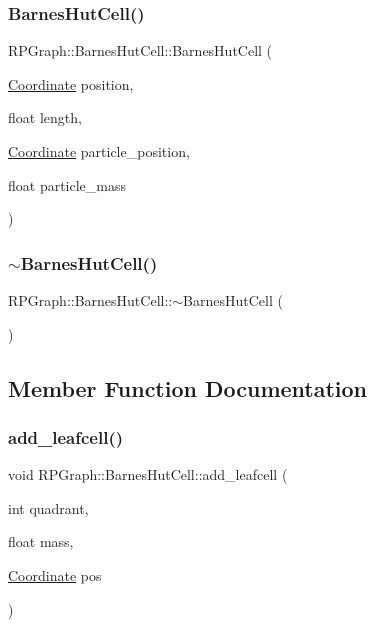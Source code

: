 \subsubsection{\texorpdfstring{Barnes\+Hut\+Cell()}{BarnesHutCell()}}
{\footnotesize\ttfamily R\+P\+Graph\+::\+Barnes\+Hut\+Cell\+::\+Barnes\+Hut\+Cell (\begin{DoxyParamCaption}\item[{\mbox{\hyperlink{classRPGraph_1_1Coordinate}{Coordinate}}}]{position,  }\item[{float}]{length,  }\item[{\mbox{\hyperlink{classRPGraph_1_1Coordinate}{Coordinate}}}]{particle\+\_\+position,  }\item[{float}]{particle\+\_\+mass }\end{DoxyParamCaption})}

\mbox{\label{classRPGraph_1_1BarnesHutCell_a1d9b48ff01e6bd127dceea8fc0ffc7c5}} 
\subsubsection{\texorpdfstring{$\sim$\+Barnes\+Hut\+Cell()}{~BarnesHutCell()}}
{\footnotesize\ttfamily R\+P\+Graph\+::\+Barnes\+Hut\+Cell\+::$\sim$\+Barnes\+Hut\+Cell (\begin{DoxyParamCaption}{ }\end{DoxyParamCaption})}



\subsection{Member Function Documentation}
\mbox{\label{classRPGraph_1_1BarnesHutCell_a1e1b9494572e56419c7d5ced4fdc9ca4}} 
\subsubsection{\texorpdfstring{add\+\_\+leafcell()}{add\_leafcell()}}
{\footnotesize\ttfamily void R\+P\+Graph\+::\+Barnes\+Hut\+Cell\+::add\+\_\+leafcell (\begin{DoxyParamCaption}\item[{int}]{quadrant,  }\item[{float}]{mass,  }\item[{\mbox{\hyperlink{classRPGraph_1_1Coordinate}{Coordinate}}}]{pos }\end{DoxyParamCaption})}

